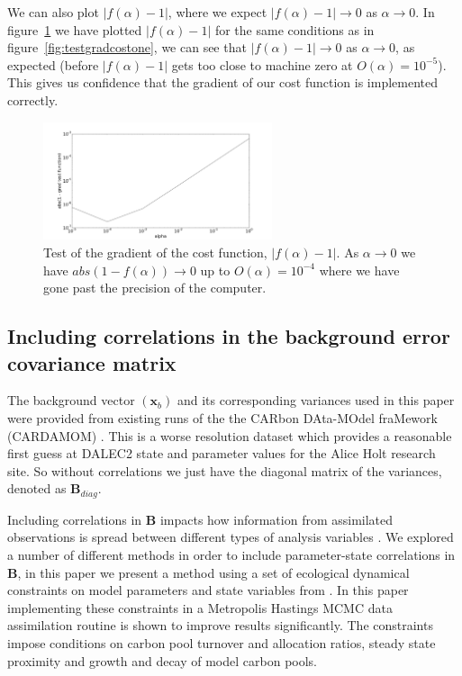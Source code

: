 \documentclass[11pt]{article}
\begin{document}
We can also plot $|f(\alpha)-1|$, where we expect $|f(\alpha)-1| \rightarrow 0$ as $\alpha \rightarrow 0$.  In figure~\ref{fig:testgradcost} we have plotted $|f(\alpha)-1|$ for the same conditions as in figure~\ref{fig:testgradcostone}, we can see that $|f(\alpha) - 1| \rightarrow 0$ as $\alpha \rightarrow 0$, as expected (before $|f(\alpha)-1|$ gets too close to machine zero at $O(\alpha) = 10^{-5}$). This gives us confidence that the gradient of our cost function is implemented correctly.
\begin{figure}[ht]
    \centering
    \includegraphics[width=0.6\textwidth]{testgradcost1.png}
    \caption{Test of the gradient of the cost function, $|f(\alpha) -1|$. As $\alpha \rightarrow 0$ we have $abs(1 - f(\alpha)) \rightarrow 0$ up to $O(\alpha) = 10^{-4}$ where we have gone past the precision of the computer.}
    \label{fig:testgradcost}
\end{figure}

\subsection{Including correlations in the background error covariance matrix} \label{sec:corB}

The background vector $(\textbf{x}_b)$ and its corresponding variances used in this paper were provided from existing runs of the the CARbon DAta-MOdel fraMework (CARDAMOM) \citep{Exbrayat2015}. This is a worse resolution dataset which provides a reasonable first guess at DALEC2 state and parameter values for the Alice Holt research site. So without correlations we just have the diagonal matrix of the variances, denoted as $\textbf{B}_{diag}$.

Including correlations in \textbf{B} impacts how information from assimilated observations is spread between different types of analysis variables \citep{Singh2011}. We explored a number of different methods in order to include parameter-state correlations in \textbf{B}, in this paper we present a method using a set of ecological dynamical constraints on model parameters and state variables from \citet{Bloom2015}. In this paper implementing these constraints in a Metropolis Hastings MCMC data assimilation routine is shown to improve results significantly. The constraints impose conditions on carbon pool turnover and allocation ratios, steady state proximity and growth and decay of model carbon pools.
\end{document}
